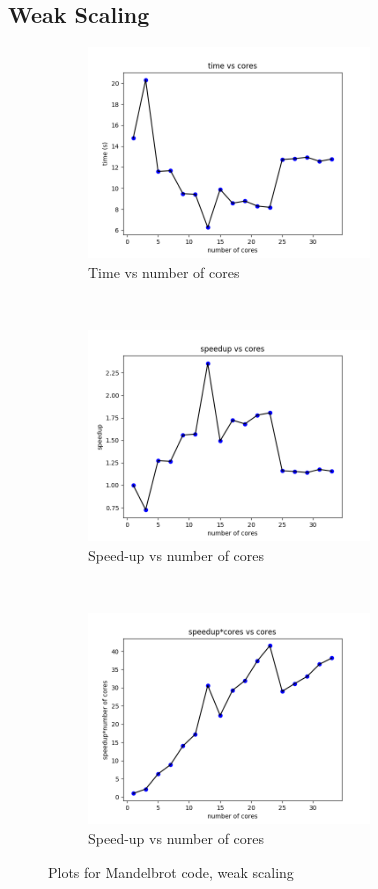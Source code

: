 \documentclass[12pt]{article}
\theoremstyle{plain}
\theoremstyle{definition}
\begin{document}
\subsection{Weak Scaling}
\begin{figure}[t]
    \centering
    \begin{subfigure}[t]{0.5\textwidth}
        \centering
        \includegraphics[height=2.2in]{timeq1_weak.png}
         \caption{Time vs number of cores}
    \end{subfigure}%
    ~
    \begin{subfigure}[t]{0.5\textwidth}
        \centering
        \includegraphics[height=2.2in]{speedupq1_weak.png}
        \caption{Speed-up vs number of cores}
    \end{subfigure}
        ~
    \begin{subfigure}[t]{0.5\textwidth}
        \centering
        \includegraphics[height=2.2in]{speed_coresq1_weak.png}
        \caption{Speed-up vs number of cores}
    \end{subfigure}
    \caption{Plots for Mandelbrot code, weak scaling }
    \label{fig:q1c}
\end{figure}
\end{document}
